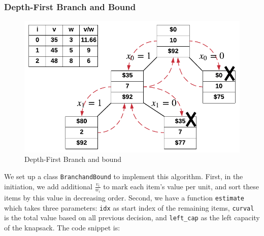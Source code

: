 \documentclass[../main.tex]{subfiles}
\begin{document}


\subsubsection{Depth-First Branch and Bound}
\begin{figure}[h]
    \centering
    \includegraphics[width= 0.98\columnwidth]{fig/branch_and_bound_backtracking.png}
    \caption{Depth-First Branch and bound}
    \label{fig:knapsack_backtracking}
\end{figure}
We set up a class \texttt{BranchandBound} to implement this algorithm. First, in the initiation, we add additional $\frac{v_i}{w_i}$ to mark each item's value per unit, and sort these items by this value in decreasing order. Second, we have a function \texttt{estimate} which takes three parameters: \texttt{idx} as start index of the remaining items, \texttt{curval} is the total value based on all previous decision, and \texttt{left\_cap} as the left capacity of the knapsack. The code snippet is:
\end{document}
